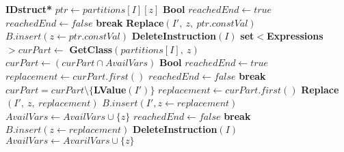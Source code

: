 \begin{algorithm}
\begin{algorithmic}[1]
                \State \textbf{IDstruct*} $ptr \gets partitions[I][z]$
                \State
                    \State \textbf{Bool} $reachedEnd \gets true$
                            \State $reachedEnd \gets false$
                            \State \textbf{break}
                        \EndIf
                        \State \textbf{Replace}$(I',\ z,\ ptr.constVal)$
                    \EndFor
                        \State $B.insert(z \gets ptr.constVal)$
                    \EndIf
                    \State
                    \State \textbf{DeleteInstruction}$(I)$
                \Else
                    \State \textbf{set}$<$\textbf{Expressions}$> curPart \gets$ \textbf{GetClass}$(partitions[I],\ z)$
                    \State $curPart \gets (curPart \cap AvailVars)$
                    \State
                        \State \textbf{Bool} $reachedEnd \gets true$
                        \State $replacement \gets curPart.first()$
                        \State
                                \State $reachedEnd \gets false$           
                                \State \textbf{break}
                            \EndIf
                            \State $curPart = curPart \setminus \{$\textbf{LValue}$(I')\}$
                                \State $replacement \gets curPart.first()$
                                \State \textbf{Replace}$(I',\ z,\ replacement)$
                            \Else
                                \State $B.insert(I', z \gets replacement)$
                                \State $AvailVars \gets AvailVars \cup \{z\}$
                                \State $reachedEnd \gets false$
                                \State \textbf{break}
                            \EndIf
                        \EndFor
                        \State
                            \State $B.insert(z \gets replacement)$
                        \EndIf
                        \State \textbf{DeleteInstruction}$(I)$
                        \State
                    \Else
                        \State $AvailVars \gets AvarilVars \cup \{z\}$
                    \EndIf
                \EndIf
            \EndIf
        \EndFor
    \EndFor
\EndProcedure
\end{algorithmic}
\end{algorithm}
    
